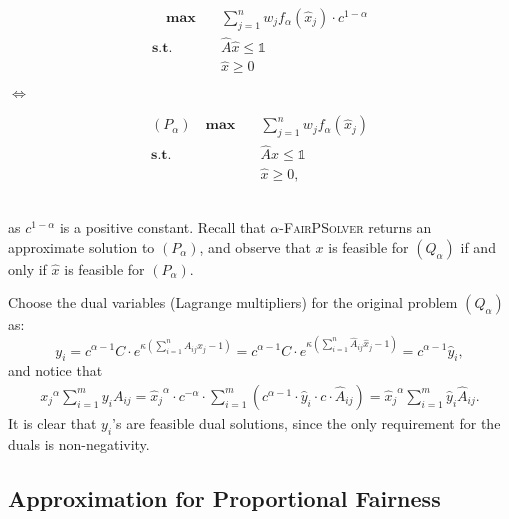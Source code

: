 \documentclass[11pt]{article}
\begin{document}
\begin{minipage}{.4\linewidth}
\begin{align*}
\quad\textbf{max} \quad&\sum_{j=1}^n w_jf_{\alpha}({\widehat{x}_j})\cdot c^{1-\alpha}\\
\textbf{s.t.}\quad& \widehat{A}\widehat{x} \leq \mathds{1}\\
&\widehat{x}\geq 0
\end{align*}
\end{minipage}
$\Leftrightarrow$
\begin{minipage}{.4\linewidth}
\begin{align*}
{({P_\alpha})}\quad \textbf{max} \quad&\sum_{j=1}^n w_jf_{\alpha}({\widehat{x}_j})\\
\textbf{s.t.}\quad& \widehat{A}\widehat{x} \leq \mathds{1}\\
&\widehat{x}\geq 0,
\end{align*}
\end{minipage}\\
as $c^{1-\alpha}$ is a positive constant. Recall that \textsc{$\alpha$-FairPSolver} returns an approximate solution to $({P_\alpha})$, and observe that $x$ is feasible for $(Q_\alpha)$ if and only if $\widehat{x}$ is feasible for $(P_\alpha)$.

Choose the dual variables (Lagrange multipliers) for the original problem $(Q_\alpha)$ as:
\begin{equation}
y_i = c^{\alpha-1} C \cdot e^{\kappa(\sum_{i=1}^n A_{ij}x_j - 1)} = c^{\alpha-1} C \cdot e^{\kappa(\sum_{i=1}^n \widehat{A}_{ij}{\widehat{x}_j} - 1)}  = c^{\alpha-1} \widehat{y}_i,\label{eq:transformed-y}
\end{equation}
and notice that 
\begin{align}
{x_j}^{\alpha}\sum_{i=1}^{m}y_i A_{ij} = {\widehat{x}_j}^{\alpha} \cdot c^{-\alpha}\cdot\sum_{i=1}^{m} (c^{\alpha-1}\cdot\widehat{y}_i \cdot c\cdot \widehat{A}_{ij} )
= {{\widehat{x}_j}}^{\alpha}\sum_{i=1}^m \widehat{y}_i \widehat{A}_{ij}.\label{eq:condition-equality}
\end{align}
It is clear that $y_i$'s are feasible dual solutions, since the only requirement for the duals is non-negativity.

\subsection{Approximation for Proportional Fairness} 
\end{document}
